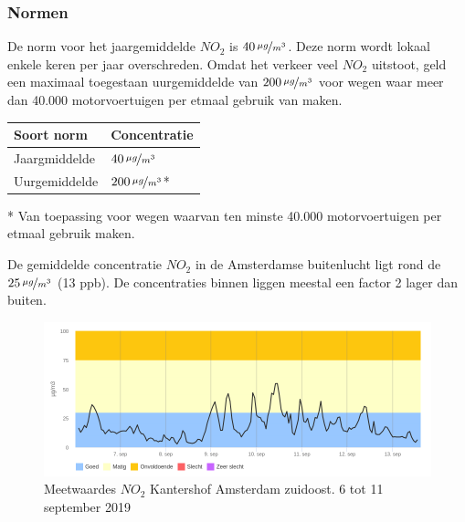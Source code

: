 \documentclass[a4paper, 11pt]{article} %
\begin{document}
\subsubsection{Normen}
De norm voor het jaargemiddelde $NO_2$ is 	$40\,\nicefrac{\mu g}{m^{3}}$. Deze norm wordt lokaal enkele keren per jaar overschreden. Omdat het verkeer veel $NO_2$ uitstoot, geld een maximaal toegestaan uurgemiddelde van $200\,\nicefrac{\mu g}{m^{3}}$ voor wegen waar meer dan 40.000 motorvoertuigen per etmaal gebruik van maken.

\begin{center}
	\begin{tabular}{ | m{5cm} | m{5cm}| } 
		\hline
		Soort norm & Concentratie \\
		\hline
		Jaargmiddelde & $40\,\nicefrac{\mu g}{m^{3}}$
		\\ 
		\hline
		Uurgemiddelde & $200\,\nicefrac{\mu g}{m^{3}}$* 
		\\ 
		\hline
	\end{tabular}
\end{center}

\begin{footnotesize} 
	* Van toepassing voor wegen waarvan ten minste 40.000 motorvoertuigen per etmaal gebruik maken.
\end{footnotesize}

De gemiddelde concentratie $NO_2$ in de Amsterdamse buitenlucht ligt rond de $25\,\nicefrac{\mu g}{m^{3}}$ (13 ppb). De concentraties binnen liggen meestal een factor 2 lager dan buiten. 

\begin{figure}
	\centering
	\includegraphics[width=.9\linewidth]{amsterdam.png}
	\caption{Meetwaardes $NO_2$ Kantershof Amsterdam zuidoost. 6 tot 11 september 2019 \cite{grafiek}}
	\label{fig:grafiek}
\end{figure}

\newpage
\end{document}
